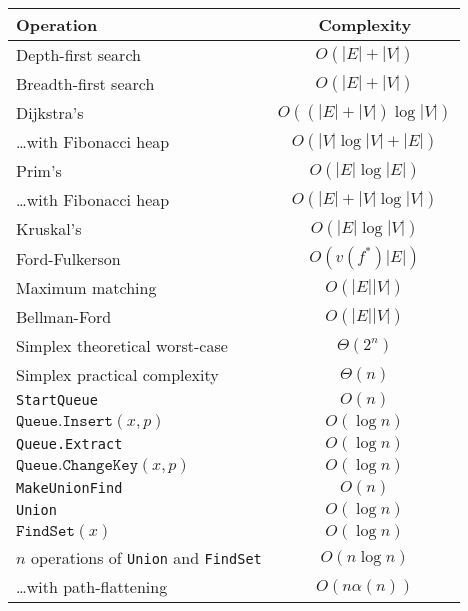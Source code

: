 \documentclass[twocolumn,a4paper,8pt]{extarticle}
\begin{document}
\begin{tabular}{|l|c|}
  \hline
  Operation & Complexity \\
  \hline
  Depth-first search & \(O(|E| + |V|)\)\\
  Breadth-first search & \(O(|E| + |V|)\)\\
  Dijkstra's & \(O((|E| + |V|)\log|V|)\)\\
  \dots with Fibonacci heap & \(O(|V|\log |V| + |E|)\)\\
  Prim's & \(O(|E|\log|E|)\)\\
  \dots with Fibonacci heap & \(O(|E| + |V|\log |V|)\)\\
  Kruskal's & \(O(|E|\log|V|)\)\\
  Ford-Fulkerson & \(O(v(f^*)|E|)\)\\
  Maximum matching & \(O(|E||V|)\)\\
  Bellman-Ford & \(O(|E||V|)\)\\
  Simplex theoretical worst-case & \(\Theta(2^n)\)\\
  Simplex practical complexity & \(\Theta(n)\)\\
  \hline
  \texttt{StartQueue} & \(O(n)\)\\
  \(\texttt{Queue.Insert}(x, p)\) & \(O(\log n)\)\\
  \texttt{Queue.Extract} & \(O(\log n)\)\\
  \(\texttt{Queue.ChangeKey}(x, p)\) & \(O(\log n)\)\\
  \hline
  \texttt{MakeUnionFind} & \(O(n)\)\\
  \texttt{Union} & \(O(\log n)\)\\
  \(\texttt{FindSet}(x)\) & \(O(\log n)\)\\
  \(n\) operations of \texttt{Union} and \texttt{FindSet} & \(O(n\log
  n)\)\\
  \dots with path-flattening & \(O(n \alpha(n))\)\\
  \hline
\end{tabular}
\end{document}
